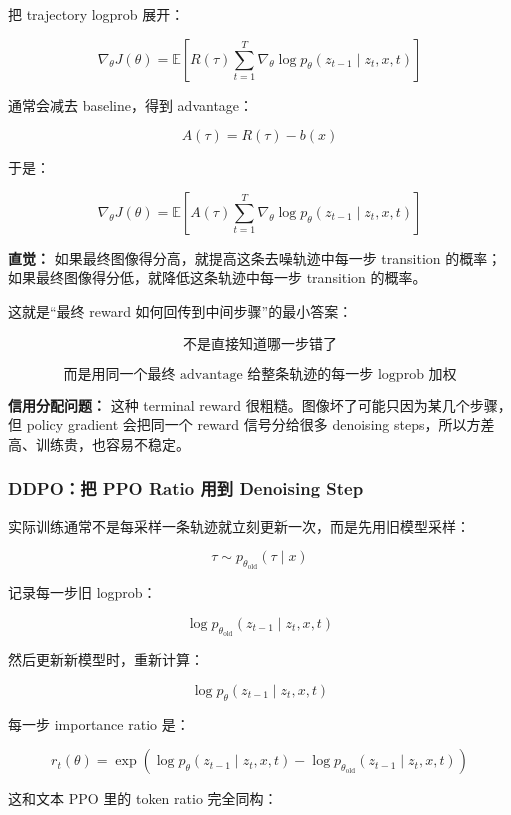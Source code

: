 把 trajectory logprob 展开：

\[
\nabla_\theta J(\theta)
=
\mathbb{E}
\left[
R(\tau)
\sum_{t=1}^{T}
\nabla_\theta
\log p_\theta(z_{t-1}\mid z_t,x,t)
\right]
\]

通常会减去 baseline，得到 advantage：

\[
A(\tau)
=
R(\tau)-b(x)
\]

于是：

\[
\nabla_\theta J(\theta)
=
\mathbb{E}
\left[
A(\tau)
\sum_{t=1}^{T}
\nabla_\theta
\log p_\theta(z_{t-1}\mid z_t,x,t)
\right]
\]

\begin{intubox}
\textbf{直觉：} 如果最终图像得分高，就提高这条去噪轨迹中每一步 transition 的概率；如果最终图像得分低，就降低这条轨迹中每一步 transition 的概率。
\end{intubox}

这就是“最终 reward 如何回传到中间步骤”的最小答案：

\[
\text{不是直接知道哪一步错了}
\]

\[
\text{而是用同一个最终 advantage 给整条轨迹的每一步 logprob 加权}
\]

\begin{warnbox}
\textbf{信用分配问题：} 这种 terminal reward 很粗糙。图像坏了可能只因为某几个步骤，但 policy gradient 会把同一个 reward 信号分给很多 denoising steps，所以方差高、训练贵，也容易不稳定。
\end{warnbox}

\subsubsection{DDPO：把 PPO Ratio 用到 Denoising Step}

实际训练通常不是每采样一条轨迹就立刻更新一次，而是先用旧模型采样：

\[
\tau\sim p_{\theta_\text{old}}(\tau\mid x)
\]

记录每一步旧 logprob：

\[
\log p_{\theta_\text{old}}(z_{t-1}\mid z_t,x,t)
\]

然后更新新模型时，重新计算：

\[
\log p_\theta(z_{t-1}\mid z_t,x,t)
\]

每一步 importance ratio 是：

\[
r_t(\theta)
=
\exp
\left(
\log p_\theta(z_{t-1}\mid z_t,x,t)
-
\log p_{\theta_\text{old}}(z_{t-1}\mid z_t,x,t)
\right)
\]

这和文本 PPO 里的 token ratio 完全同构：

